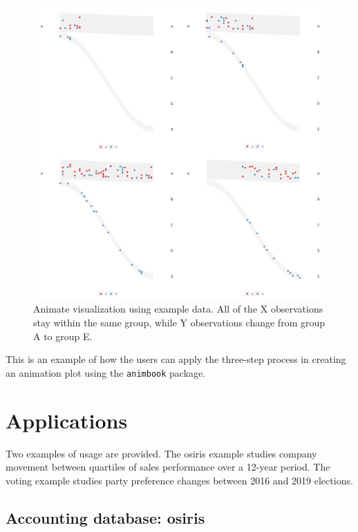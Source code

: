 \begin{figure}

{\centering \includegraphics[width=1\linewidth]{figures/animation-example} 

}

\caption{Animate visualization using example data. All of the X observations stay within the same group, while Y observations change from group A to group E.}\label{fig:catchange-figure}
\end{figure}

This is an example of how the users can apply the three-step process in creating an animation plot using the \texttt{animbook} package.

\hypertarget{applications}{%
\section{Applications}\label{applications}}

Two examples of usage are provided. The osiris example studies company movement between quartiles of sales performance over a 12-year period. The voting example studies party preference changes between 2016 and 2019 elections.

\hypertarget{accounting-database-osiris}{%
\subsection{Accounting database: osiris}\label{accounting-database-osiris}}

